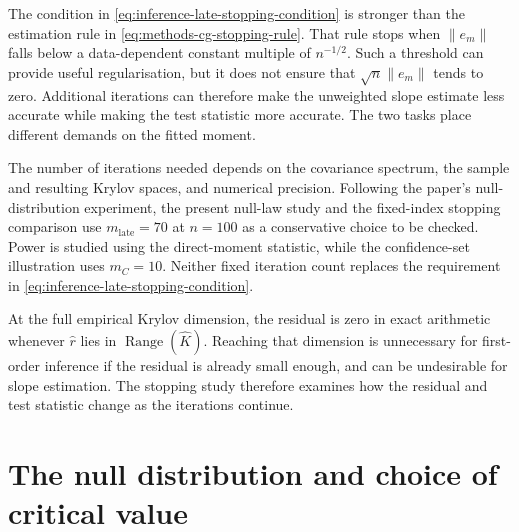 The condition in \eqref{eq:inference-late-stopping-condition} is stronger
than the estimation rule in
\eqref{eq:methods-cg-stopping-rule}.  That rule stops when $\|e_m\|$ falls
below a data-dependent constant multiple of $n^{-1/2}$.  Such a threshold
can provide useful regularisation, but it does not ensure that
$\sqrt n\|e_m\|$ tends to zero.  Additional iterations can therefore make
the unweighted slope estimate less accurate while making the test statistic
more accurate.  The two tasks place different demands on the fitted moment.

The number of iterations needed depends on the covariance spectrum, the
sample and resulting Krylov spaces, and numerical precision.  Following the
paper's null-distribution experiment, the present null-law study and the
fixed-index stopping comparison use $m_{\mathrm{late}}=70$ at $n=100$ as a
conservative choice to be checked.  Power is studied using the direct-moment
statistic, while the confidence-set illustration uses $m_C=10$.  Neither
fixed iteration count replaces the requirement in
\eqref{eq:inference-late-stopping-condition}.

At the full empirical Krylov dimension, the residual is zero in exact
arithmetic whenever $\widehat r$ lies in
$\operatorname{Range}(\widehat K)$.  Reaching that dimension is unnecessary
for first-order inference if the residual is already small enough, and can
be undesirable for slope estimation.  The stopping study therefore examines
how the residual and test statistic change as the iterations continue.

\section{The null distribution and choice of critical value}
\label{sec:inference-calibration}

